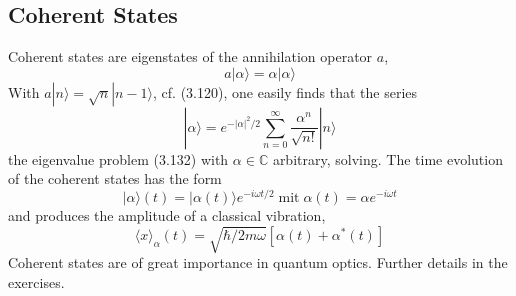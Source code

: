 \subsection{Coherent States}
Coherent states are eigenstates of the annihilation operator $a$,
\begin{equation}
    a|\alpha\rangle=\alpha|\alpha\rangle
    \end{equation}
With $a|n\rangle=\sqrt{n}|n-1\rangle$, cf. (3.120), one easily finds that the series
\begin{equation}
    |\alpha\rangle= e^{-|\alpha|^{2} / 2} \sum_{n=0}^{\infty} \frac{\alpha^{n}}{\sqrt{n !}}|n\rangle
    \end{equation}
the eigenvalue problem (3.132) with $\alpha \in\mathbb{C}$ arbitrary, solving. The time evolution of the coherent states has the form
\begin{equation}
    |\alpha\rangle(t)=|\alpha(t)\rangle e^{-i \omega t / 2} \operatorname{mit} \alpha(t)=\alpha e^{-i \omega t}
    \end{equation}
and produces the amplitude of a classical vibration,
\begin{equation}
    \langle x\rangle_{\alpha}(t)=\sqrt{\hbar / 2 m \omega}\left[\alpha(t)+\alpha^{*}(t)\right]
    \end{equation}
Coherent states are of great importance in quantum optics. Further details in the exercises.
